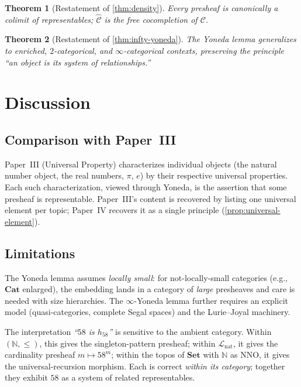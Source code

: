 \documentclass[12pt]{article}
\newtheorem{theorem}{Theorem}[section]
\theoremstyle{definition}
\theoremstyle{remark}
\begin{document}
\begin{theorem}[Restatement of \cref{thm:density}]
Every presheaf is canonically a colimit of representables; $\widehat{\mathcal{C}}$ is the free cocompletion of $\mathcal{C}$.
\end{theorem}

\begin{theorem}[Restatement of \cref{thm:infty-yoneda}]
The Yoneda lemma generalizes to enriched, $2$-categorical, and $\infty$-categorical contexts, preserving the principle ``an object is its system of relationships.''
\end{theorem}

\section{Discussion}
\label{sec:discussion}

\subsection{Comparison with Paper~III}

Paper~III (Universal Property) characterizes individual objects (the natural number object, the real numbers, $\pi$, $e$) by their respective universal properties. Each such characterization, viewed through Yoneda, is the assertion that some presheaf is representable. Paper~III's content is recovered by listing one universal element per topic; Paper~IV recovers it as a single principle (\cref{prop:universal-element}).

\subsection{Limitations}

The Yoneda lemma assumes \emph{locally small}: for not-locally-small categories (e.g., $\mathbf{Cat}$ enlarged), the embedding lands in a category of \emph{large} presheaves and care is needed with size hierarchies. The $\infty$-Yoneda lemma further requires an explicit model (quasi-categories, complete Segal spaces) and the Lurie--Joyal machinery.

The interpretation \emph{``$58$ is $h_{58}$''} is sensitive to the ambient category. Within $(\mathbb{N}, \le)$, this gives the singleton-pattern presheaf; within $\mathcal{L}_{\mathrm{nat}}$, it gives the cardinality presheaf $m \mapsto 58^{m}$; within the topos of $\mathbf{Set}$ with $\mathbb{N}$ as NNO, it gives the universal-recursion morphism. Each is correct \emph{within its category}; together they exhibit $58$ as a system of related representables.
\end{document}

